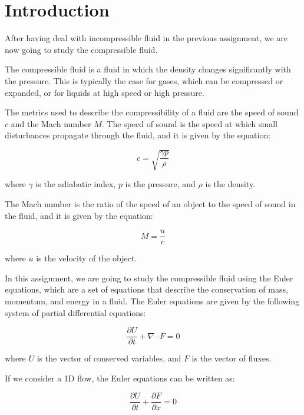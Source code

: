 \section{Introduction}
\label{sec:introduction}

After having deal with incompressible fluid in the previous assignment, we are now going to study the compressible fluid.

The compressible fluid is a fluid in which the density changes significantly with the pressure.
This is typically the case for gases, which can be compressed or expanded, or for liquids at high speed or high pressure.

The metrics used to describe the compressibility of a fluid are the speed of sound $c$ and the Mach number $M$.
The speed of sound is the speed at which small disturbances propagate through the fluid, and it is given by the equation:

\begin{equation}
    c = \sqrt{\frac{\gamma p}{\rho}}
\end{equation}

where $\gamma$ is the adiabatic index, $p$ is the pressure, and $\rho$ is the density.

The Mach number is the ratio of the speed of an object to the speed of sound in the fluid, and it is given by the equation:

\begin{equation}
    M = \frac{u}{c}
\end{equation}

where $u$ is the velocity of the object.

In this assignment, we are going to study the compressible fluid using the Euler equations, which are a set of equations that describe the conservation of mass, momentum, and energy in a fluid.
The Euler equations are given by the following system of partial differential equations:

\begin{equation}
    \frac{\partial U}{\partial t} + \nabla \cdot F = 0
\end{equation}

where $U$ is the vector of conserved variables, and $F$ is the vector of fluxes.

If we consider a 1D flow, the Euler equations can be written as:

\begin{equation}
    \frac{\partial U}{\partial t} + \frac{\partial F}{\partial x} = 0
    \label{eq:euler_equations}
\end{equation}

